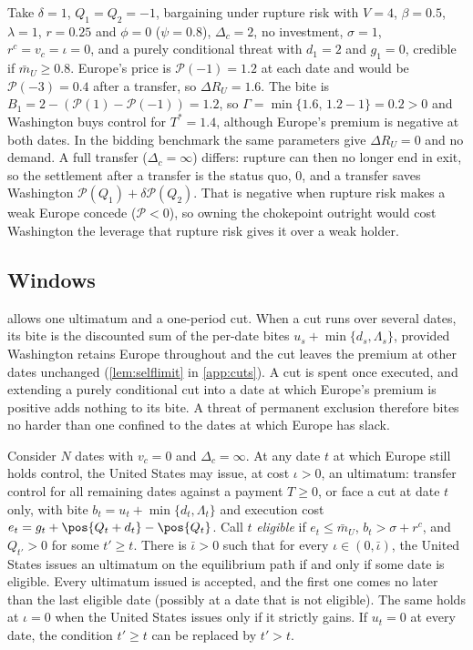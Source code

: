 Take $\delta=1$, $Q_1=Q_2=-1$, bargaining under rupture risk with $V=4$, $\beta=0.5$, $\lambda=1$, $r=0.25$ and $\phi=0$ ($\psi=0.8$), $\Delta_c=2$, no investment, $\sigma=1$, $r^c=v_c=\iota=0$, and a purely conditional threat with $d_1=2$ and $g_1=0$, credible if $\bar m_U\ge 0.8$. Europe's price is $\mathcal P(-1)=1.2$ at each date and would be $\mathcal P(-3)=0.4$ after a transfer, so $\Delta R_U=1.6$. The bite is $B_1=2-(\mathcal P(1)-\mathcal P(-1))=1.2$, so $\Gamma=\min\{1.6,\,1.2-1\}=0.2>0$ and Washington buys control for $T^*=1.4$, although Europe's premium is negative at both dates. In the bidding benchmark the same parameters give $\Delta R_U=0$ and no demand. A full transfer ($\Delta_c=\infty$) differs: rupture can then no longer end in exit, so the settlement after a transfer is the status quo, $0$, and a transfer saves Washington $\mathcal P(Q_1)+\delta\mathcal P(Q_2)$. That is negative when rupture risk makes a weak Europe concede ($\mathcal P<0$), so owning the chokepoint outright would cost Washington the leverage that rupture risk gives it over a weak holder.

\subsection{Windows}\label{sec:windows}

 allows one ultimatum and a one-period cut. When a cut runs over several dates, its bite is the discounted sum of the per-date bites $u_s+\min\{d_s,\Lambda_s\}$, provided Washington retains Europe throughout and the cut leaves the premium at other dates unchanged (\cref{lem:selflimit} in \cref{app:cuts}). A cut is spent once executed, and extending a purely conditional cut into a date at which Europe's premium is positive adds nothing to its bite. A threat of permanent exclusion therefore bites no harder than one confined to the dates at which Europe has slack.

\begin{corollary}[Windows]\label{cor:windows}
Consider $N$ dates with $v_c=0$ and $\Delta_c=\infty$. At any date $t$ at which Europe still holds control, the United States may issue, at cost $\iota>0$, an ultimatum: transfer control for all remaining dates against a payment $T\ge 0$, or face a cut at date $t$ only, with bite $b_t=u_t+\min\{d_t,\Lambda_t\}$ and execution cost $e_t=g_t+\pos{Q_t+d_t}-\pos{Q_t}$. Call $t$ \emph{eligible} if $e_t\le\bar m_U$, $b_t>\sigma+r^c$, and $Q_{t'}>0$ for some $t'\ge t$. There is $\bar\iota>0$ such that for every $\iota\in(0,\bar\iota)$, the United States issues an ultimatum on the equilibrium path if and only if some date is eligible. Every ultimatum issued is accepted, and the first one comes no later than the last eligible date (possibly at a date that is not eligible). The same holds at $\iota=0$ when the United States issues only if it strictly gains. If $u_t=0$ at every date, the condition $t'\ge t$ can be replaced by $t'>t$.
\end{corollary}

